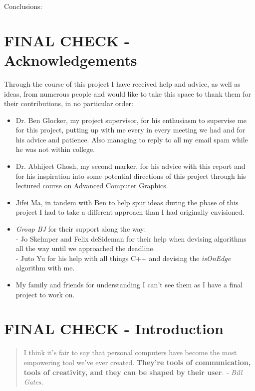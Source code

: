 \documentclass[11pt]{article}
\begin{document}
Conclusions:


\newpage
\section*{FINAL CHECK - Acknowledgements}
Through the course of this project I have received help and advice, as
well as ideas, from numerous people and would like to take this space
to thank them for their contributions, in no particular order:
\begin{itemize}
	\item Dr. Ben Glocker, my project supervisor, for his enthusiasm
		  to supervise me for this project, putting up with me every 
		  in every meeting we had and for his advice and patience. Also
		  managing to reply to all my email spam while he was not
		  within college.
	\item Dr. Abhijeet Ghosh, my second marker, for his advice with
		  this report and for his inspiration into some potential
		  directions of this project through his lectured course on
		  Advanced Computer Graphics.
	\item Jifei Ma, in tandem with Ben to help spur ideas during the
		  phase of this project I had to take a different approach than
		  I had originally envisioned.
	\item \textit{Group BJ} for their support along the way: \\
		  - Jo Skelmper and Felix deSideman for their help when devising
		  algorithms all the way until we approached the deadline.\\
		  - Juto Yu for his help with all things C++ and devising the
		  	\textit{isOnEdge} algorithm with me.
	\item My family and friends for understanding I can't see them as I
		  have a final project to work on.
\end{itemize}

\newpage
\tableofcontents
\newpage

\section{FINAL CHECK - Introduction}
\begin{quote}
I think it's fair to say that personal computers have become
		the most empowering tool we've ever created. \textbf{They're tools of
		communication, tools of creativity, and they can be shaped by
		their user}. \textit{- Bill Gates.}		
\end{quote}
\end{document}
